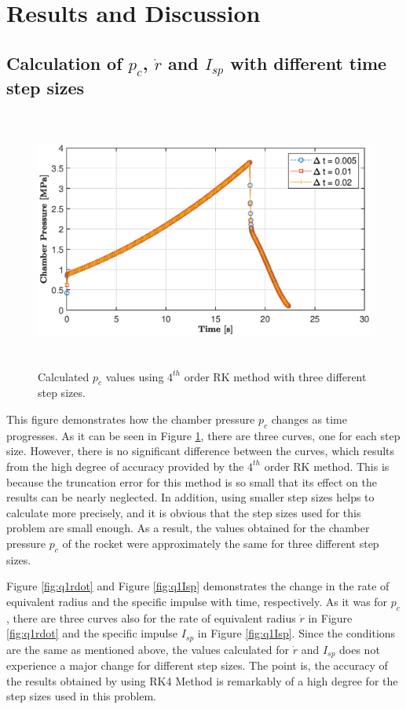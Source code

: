 \documentclass[letterpaper,12pt]{article}
\begin{document}
\section{Results and Discussion}
\subsection{Calculation of $p_c$, $\dot{r}$ and $I_{sp}$ with different time step sizes}

\begin{figure} [ht]
	\centering
	\includegraphics[height = 8.5cm]{graphs/q1_pc.eps}
	\caption{Calculated $p_c$ values using $4^{th}$ order RK method with three different step sizes.}
     \label{fig:q1pc}
\end{figure}

This figure demonstrates how the chamber pressure $p_c$ changes as time progresses. As it can be seen in 
Figure \ref{fig:q1pc}, there are three curves, one for each step size. However,
there is no significant difference between the curves, which results from the high degree of accuracy
provided by the $4^{th}$ order RK method. This is because the truncation error for this method is so
small that its effect on the results can be nearly neglected. In addition, using smaller step sizes
helps to calculate more precisely, and it is obvious that the step sizes used for this problem are small
enough. As a result, the values obtained for the chamber pressure $p_c$ of the rocket were approximately
the same for three different step sizes.

\vspace{1em}
Figure \ref{fig:q1rdot} and Figure \ref{fig:q1Isp} demonstrates the change in the rate of equivalent 
radius and the specific impulse with time, respectively.
As it was for $p_c$, there are three curves also for the rate of equivalent radius
$\dot{r}$ in Figure \ref{fig:q1rdot} and the specific impulse $I_{sp}$ in Figure \ref{fig:q1Isp}. 
Since the conditions are the same as mentioned above, the values calculated for $\dot{r}$ and $I_{sp}$ does not 
experience a major change for different step sizes. The point is, the accuracy of the results obtained by using RK4 Method
is remarkably of a high degree for the step sizes used in this problem.
\newpage
\end{document}
